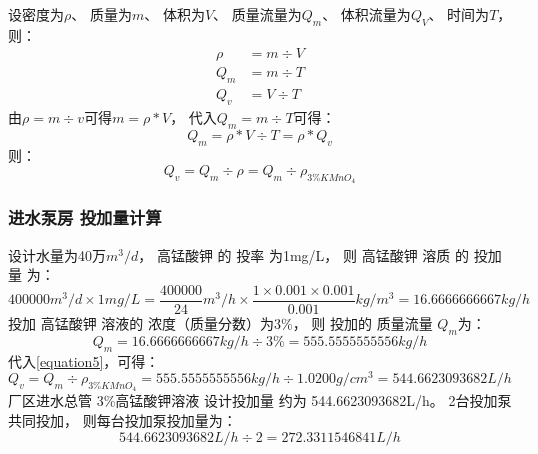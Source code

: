 \documentclass[UTF8,a4paper,12pt,titlepage]{ctexart}
\begin{document}
        设密度为$\rho$、
        质量为$m$、
        体积为$V$、
        质量流量为$Q_m$、
        体积流量为$Q_V$、
        时间为$T$，则：
        \begin{align}
            \rho &= m \div V \\
            Q_m &= m \div T\\
            Q_v &= V \div T
        \end{align}
        由$\rho = m \div v$可得$m = \rho * V$，
        代入$Q_m = m \div T$可得：
        \begin{equation}
            Q_m = \rho * V \div T = \rho * Q_v
        \end{equation}
        则：
        \begin{equation}
            Q_v = Q_m \div \rho = Q_m \div \rho_{3\%KMnO_4}
        \end{equation}\label{equation5}

    \subsubsection{进水泵房 投加量计算}
        设计水量为40万$m^3/d$，
        高锰酸钾 的 投率 为1mg/L，
        则 高锰酸钾 溶质 的 投加量 为：\\
        \begin{equation}
            400000m^3/d \times 1mg/L = \frac{400000}{24} m^3/h
            \times \frac{1 \times 0.001 \times 0.001}{0.001}kg/m^3
            = 16.6666666667 kg/h
        \end{equation}
        投加 高锰酸钾 溶液的 浓度（质量分数）为3\%，
        则 投加的 质量流量 $Q_m$为：
        \begin{equation}
            Q_m = 16.6666666667 kg/h \div 3\% = 555.5555555556 kg/h
        \end{equation}
        代入\ref{equation5}，可得：
        \begin{equation}
            Q_v = Q_m \div \rho_{3\%KMnO_4} = 555.5555555556 kg/h \div 1.0200g/cm^3 = 544.6623093682 L/h
        \end{equation}
        厂区进水总管 3\%高锰酸钾溶液 设计投加量 约为 544.6623093682L/h。
        2台投加泵共同投加，
        则每台投加泵投加量为：
        \begin{equation}
            544.6623093682 L/h \div 2 = 272.3311546841 L/h
        \end{equation}
\end{document}

